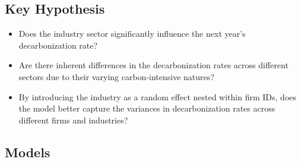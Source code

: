 \subsection{Key Hypothesis}
\begin{itemize}
    \item Does the industry sector significantly influence the next year's decarbonization rate?
    \item Are there inherent differences in the decarbonization rates across different sectors due to their varying carbon-intensive natures?
    \item By introducing the industry as a random effect nested within firm IDs, does the model better capture the variances in decarbonization rates across different firms and industries?
\end{itemize}

\subsection{Models} 



